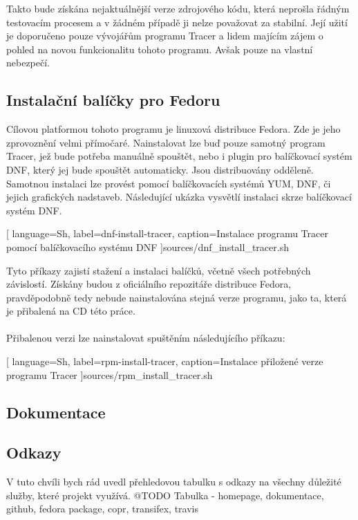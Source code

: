 \documentclass[10pt,a4paper]{article}
\begin{document}
		Takto bude získána nejaktuálnější verze zdrojového kódu, která neprošla řádným testovacím procesem a v žádném případě ji nelze považovat za stabilní. Její užití je doporučeno pouze vývojářům programu Tracer a lidem majícím zájem o pohled na novou funkcionalitu tohoto programu. Avšak pouze na vlastní nebezpečí.

		\subsection{Instalační balíčky pro Fedoru}
		Cílovou platformou tohoto programu je linuxová distribuce Fedora. Zde je jeho zprovoznění velmi přímočaré. Nainstalovat lze buď pouze samotný program Tracer, jež bude potřeba manuálně spouštět, nebo i plugin pro balíčkovací systém DNF\@, který jej bude spouštět automaticky. Jsou distribuovány odděleně. Samotnou instalaci lze provést pomocí balíčkovacích systémů YUM, DNF, či jejich grafických nadstaveb. Následující ukázka vysvětlí instalaci skrze balíčkovací systém DNF.

		
		[
			language=Sh,
			label=dnf-install-tracer,
			caption={Instalace programu Tracer pomocí balíčkovacího systému DNF}
		]{sources/dnf_install_tracer.sh}

		Tyto příkazy zajistí stažení a instalaci balíčků, včetně všech potřebných závislostí. Získány budou z oficiálního repozitáře distribuce Fedora, pravděpodobně tedy nebude nainstalována stejná verze programu, jako ta, která je přibalená na CD této práce.
		\\
		\\
		Přibalenou verzi lze nainstalovat spuštěním následujícího příkazu:

		
		[
			language=Sh,
			label=rpm-install-tracer,
			caption={Instalace přiložené verze programu Tracer}
		]{sources/rpm_install_tracer.sh}

		\subsection{Dokumentace}
		\subsection{Odkazy}
		V tuto chvíli bych rád uvedl přehledovou tabulku s odkazy na všechny důležité služby, které projekt využívá.
		@TODO Tabulka - homepage, dokumentace, github, fedora package, copr, transifex, travis


	\newpage
\end{document}
